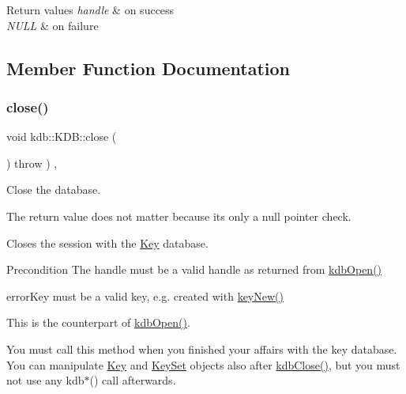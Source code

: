 \begin{DoxyRetVals}{Return values}
{\em handle} & on success \\
\hline
{\em N\+U\+LL} & on failure \\
\hline
\end{DoxyRetVals}


\subsection{Member Function Documentation}
\mbox{\label{classkdb_1_1KDB_a1b3ff4a68c2c935d67dce843bc4ad01b}} 
\subsubsection{\texorpdfstring{close()}{close()}\hspace{0.1cm}{\footnotesize\ttfamily [1/2]}}
{\footnotesize\ttfamily void kdb\+::\+K\+D\+B\+::close (\begin{DoxyParamCaption}{ }\end{DoxyParamCaption}) throw  ) \hspace{0.3cm}{\ttfamily [inline]}, {\ttfamily [virtual]}}



Close the database. 

The return value does not matter because its only a null pointer check.

Closes the session with the \hyperlink{classkdb_1_1Key}{Key} database. \begin{DoxyPrecond}{Precondition}
The handle must be a valid handle as returned from \hyperlink{group__kdb_ga6808defe5870f328dd17910aacbdc6ca}{kdb\+Open()}

error\+Key must be a valid key, e.\+g. created with \hyperlink{group__key_gad23c65b44bf48d773759e1f9a4d43b89}{key\+New()}
\end{DoxyPrecond}
This is the counterpart of \hyperlink{group__kdb_ga6808defe5870f328dd17910aacbdc6ca}{kdb\+Open()}.

You must call this method when you finished your affairs with the key database. You can manipulate \hyperlink{classkdb_1_1Key}{Key} and \hyperlink{classkdb_1_1KeySet}{Key\+Set} objects also after \hyperlink{group__kdb_gadb54dc9fda17ee07deb9444df745c96f}{kdb\+Close()}, but you must not use any kdb$\ast$() call afterwards.

